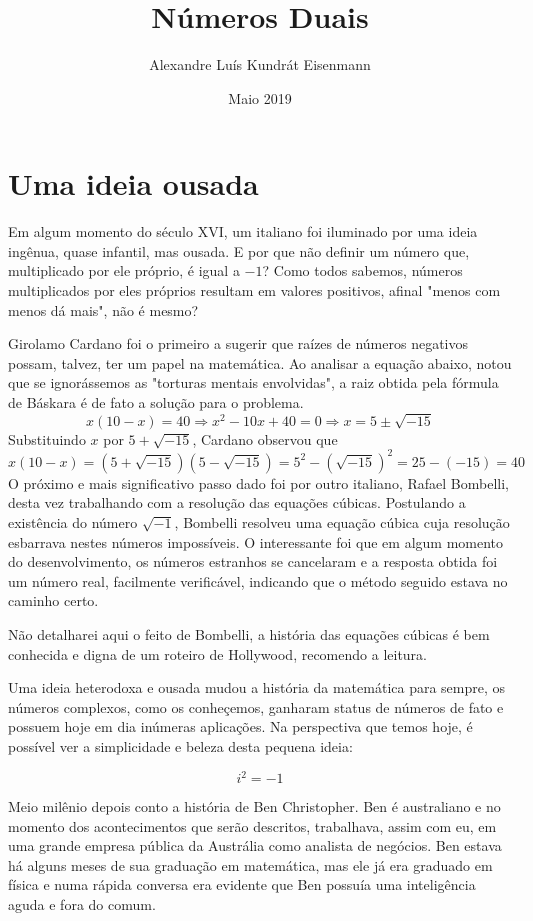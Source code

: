 \documentclass{article}
\title{Números Duais}
\author{Alexandre Luís Kundrát Eisenmann}
\date{Maio 2019}
\begin{document}
\maketitle

\section*{Uma ideia ousada}

Em algum momento do século XVI, um italiano foi iluminado por uma ideia ingênua, quase infantil, mas ousada. E por que não definir um número que, multiplicado por ele próprio,  é igual a \(-1\)? Como todos sabemos, números multiplicados por eles próprios resultam em valores positivos, afinal "menos com menos dá mais", não é mesmo?

Girolamo Cardano foi o primeiro a sugerir que raízes de números negativos possam, talvez, ter um papel na matemática. Ao analisar a equação abaixo, notou que se ignorássemos as "torturas mentais envolvidas", a raiz obtida pela fórmula de Báskara é de fato a solução para o problema.
\[x(10-x) = 40 \Rightarrow x^2 - 10x + 40 = 0 \Rightarrow x = 5 \pm \sqrt{-15} \]
Substituindo $x$ por $5+ \sqrt{-15}$, Cardano observou que
\[x(10-x) = (5 + \sqrt{-15})(5 - \sqrt{-15}) = 5^2 - (\sqrt{-15})^2 = 25 - (-15) = 40\]
O próximo e mais significativo passo dado foi por outro italiano, Rafael Bombelli, desta vez trabalhando com a resolução das equações cúbicas. Postulando a existência do número $\sqrt{-1}$, Bombelli resolveu uma equação cúbica cuja resolução esbarrava nestes números impossíveis. O interessante foi que em algum momento do desenvolvimento, os números estranhos se cancelaram e a resposta obtida foi um número real, facilmente verificável, indicando que o método seguido estava no caminho certo.

Não detalharei aqui o feito de Bombelli, a história das equações cúbicas é bem conhecida e digna de um roteiro de Hollywood, recomendo a leitura.

Uma ideia heterodoxa e ousada mudou a história da matemática para sempre, os números complexos, como os conheçemos, ganharam status de números de fato e possuem hoje em dia inúmeras aplicações. Na perspectiva que temos hoje, é possível ver a simplicidade e beleza desta pequena ideia:

\[i^2 = -1\]

Meio milênio depois conto a história de Ben Christopher. Ben é australiano e no momento dos acontecimentos que serão descritos, trabalhava, assim com eu, em uma grande empresa pública da Austrália como analista de negócios. Ben estava há alguns meses de sua graduação em matemática, mas ele já era graduado em física e numa rápida conversa era evidente que Ben possuía uma inteligência aguda e fora do comum. 
\end{document}
